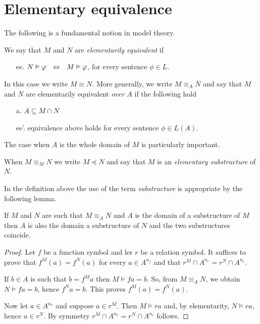 \documentclass[creche.tex]{subfiles}
\begin{document}
\section{Elementary equivalence}\label{eqel}
The following is a fundamental notion in model theory.

\begin{definition}\label{def_el_eq}
We say that $M$ and $N$ are \emph{elementarily equivalent} if
\begin{itemize}
\item[ee.] $N\vDash\varphi\ \ \Leftrightarrow\ \ M\vDash \varphi$,\hspace{4ex} for every sentence $\phi\in L$.
\end{itemize}
In this case we write \emph{$M\equiv N$}.
More generally, we write \emph{$M\equiv_A N$\/} and say that $M$ and $N$ are elementarily equivalent \emph{over $A$} if the following hold
\begin{itemize}
\item[a.] $A\subseteq M\cap N$
\item[ee'.] equivalence  above holds for every sentence $\phi\in L(A)$.\QED
\end{itemize} 
\end{definition}


The case when $A$ is the whole domain of $M$ is particularly important.

\begin{definition}\label{def_el_sub}
When $M\equiv_M N$ we write \emph{$M\preceq N$\/} and say that $M$ is an \emph{elementary substructure\/} of $N$.\QED
\end{definition}

In the definition above the use of the term \textit{substructure\/} is appropriate by the following lemma.

\begin{lemma}\label{eqelsubstructure}
If $M$ and $N$ are such that $M\equiv_AN$ and $A$ is the domain of a substructure of $M$ then $A$ is also the domain a substructure of $N$ and the two substructures coincide.
\end{lemma}
\begin{proof}
Let $f$ be a function symbol and ler $r$ be a relation symbol.
It suffices to prove that  
$f^M(a)=f^N(a)$ for every $a\in A^{n_f}$ and that $r^M\cap A^{n_r}=r^N\cap A^{n_r}$.

If $b\in A$ is such that $b=f^Ma$ then $M\models fa=b$.
So, from $M\equiv_AN$, we obtain $N\models fa=b$, hence $f^Na=b$.
This proves $f^M(a)=f^N(a)$.

Now let $a\in A^{n_r}$ and suppose $a\in r^M$.
Then $M\models ra$ and, by elementarity, $N\models ra$, hence $a\in r^N$.
By symmetry $r^M\cap A^{n_r}=r^N\cap A^{n_r}$ follows.
\end{proof}
\end{document}
